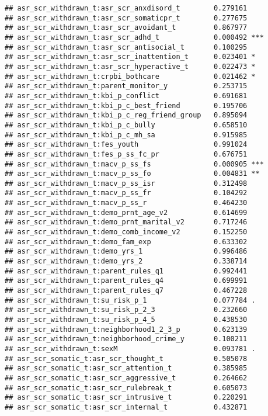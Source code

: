 \documentclass[
]{article}
\begin{document}
\begin{verbatim}
## asr_scr_withdrawn_t:asr_scr_anxdisord_t        0.279161    
## asr_scr_withdrawn_t:asr_scr_somaticpr_t        0.277675    
## asr_scr_withdrawn_t:asr_scr_avoidant_t         0.867977    
## asr_scr_withdrawn_t:asr_scr_adhd_t             0.000492 ***
## asr_scr_withdrawn_t:asr_scr_antisocial_t       0.100295    
## asr_scr_withdrawn_t:asr_scr_inattention_t      0.023401 *  
## asr_scr_withdrawn_t:asr_scr_hyperactive_t      0.022473 *  
## asr_scr_withdrawn_t:crpbi_bothcare             0.021462 *  
## asr_scr_withdrawn_t:parent_monitor_y           0.253715    
## asr_scr_withdrawn_t:kbi_p_conflict             0.691681    
## asr_scr_withdrawn_t:kbi_p_c_best_friend        0.195706    
## asr_scr_withdrawn_t:kbi_p_c_reg_friend_group   0.895094    
## asr_scr_withdrawn_t:kbi_p_c_bully              0.658510    
## asr_scr_withdrawn_t:kbi_p_c_mh_sa              0.915985    
## asr_scr_withdrawn_t:fes_youth                  0.991024    
## asr_scr_withdrawn_t:fes_p_ss_fc_pr             0.676751    
## asr_scr_withdrawn_t:macv_p_ss_fs               0.000905 ***
## asr_scr_withdrawn_t:macv_p_ss_fo               0.004831 ** 
## asr_scr_withdrawn_t:macv_p_ss_isr              0.312498    
## asr_scr_withdrawn_t:macv_p_ss_fr               0.104292    
## asr_scr_withdrawn_t:macv_p_ss_r                0.464230    
## asr_scr_withdrawn_t:demo_prnt_age_v2           0.614699    
## asr_scr_withdrawn_t:demo_prnt_marital_v2       0.717246    
## asr_scr_withdrawn_t:demo_comb_income_v2        0.152250    
## asr_scr_withdrawn_t:demo_fam_exp               0.633302    
## asr_scr_withdrawn_t:demo_yrs_1                 0.996486    
## asr_scr_withdrawn_t:demo_yrs_2                 0.338714    
## asr_scr_withdrawn_t:parent_rules_q1            0.992441    
## asr_scr_withdrawn_t:parent_rules_q4            0.699991    
## asr_scr_withdrawn_t:parent_rules_q7            0.467228    
## asr_scr_withdrawn_t:su_risk_p_1                0.077784 .  
## asr_scr_withdrawn_t:su_risk_p_2_3              0.232660    
## asr_scr_withdrawn_t:su_risk_p_4_5              0.438530    
## asr_scr_withdrawn_t:neighborhood1_2_3_p        0.623139    
## asr_scr_withdrawn_t:neighborhood_crime_y       0.100211    
## asr_scr_withdrawn_t:sexM                       0.093781 .  
## asr_scr_somatic_t:asr_scr_thought_t            0.505078    
## asr_scr_somatic_t:asr_scr_attention_t          0.385985    
## asr_scr_somatic_t:asr_scr_aggressive_t         0.264662    
## asr_scr_somatic_t:asr_scr_rulebreak_t          0.605073    
## asr_scr_somatic_t:asr_scr_intrusive_t          0.220291    
## asr_scr_somatic_t:asr_scr_internal_t           0.432871    

\end{verbatim}
\end{document}
